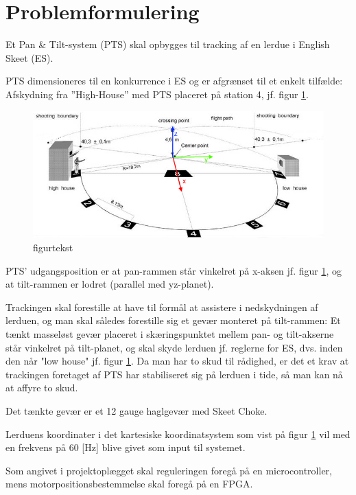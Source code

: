 \section{Problemformulering}
\label{sec:problemformulering}

Et Pan \& Tilt-system (PTS) skal opbygges til tracking af en lerdue i English Skeet (ES).

PTS dimensioneres til en konkurrence i ES og er afgrænset til et enkelt tilfælde:
Afskydning fra ”High-House” med PTS placeret på station 4, jf. figur \ref{fig:ES}.
\begin{figure}[th!]
\centering
\includegraphics[width=1\textwidth]{./graphics/skeet_diagram_cropped_axes}
\caption[tekst i indholdsfortegnelsen]{figurtekst}
\label{fig:ES}
\end{figure}	
PTS' udgangsposition er at pan-rammen står vinkelret på x-aksen jf. figur \ref{fig:ES},
og at tilt-rammen er lodret (parallel med yz-planet).

Trackingen skal forestille at have til formål at assistere i nedskydningen af lerduen,
og man skal således forestille sig et gevær monteret på tilt-rammen:
Et tænkt masseløst gevær placeret i skæringspunktet mellem pan- og tilt-akserne står vinkelret
på tilt-planet, og skal skyde lerduen jf. reglerne for ES, dvs. inden den når "low house" jf. figur \ref{fig:ES}.
Da man har to skud til rådighed, er det et krav at trackingen foretaget af PTS har stabiliseret sig på lerduen
i tide, så man kan nå at affyre to skud.

Det tænkte gevær er et 12 gauge haglgevær med Skeet Choke.

Lerduens koordinater i det kartesiske koordinatsystem som vist på figur \ref{fig:ES}
vil med en frekvens på 60 [Hz] blive givet som input til systemet.

Som angivet i projektoplægget skal reguleringen foregå på en microcontroller,
mens motorpositionsbestemmelse skal foregå på en FPGA.